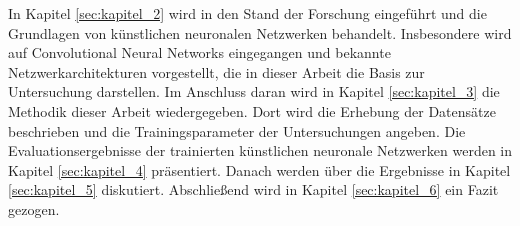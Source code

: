In Kapitel \ref{sec:kapitel_2} wird in den Stand der Forschung eingeführt und die Grundlagen von künstlichen neuronalen Netzwerken behandelt. Insbesondere wird auf Convolutional Neural Networks eingegangen und bekannte Netzwerkarchitekturen vorgestellt, die in dieser Arbeit die Basis zur Untersuchung darstellen.
Im Anschluss daran wird in Kapitel \ref{sec:kapitel_3} die Methodik dieser Arbeit wiedergegeben. Dort wird die Erhebung der Datensätze beschrieben und die Trainingsparameter der Untersuchungen angeben. 
Die Evaluationsergebnisse der trainierten künstlichen neuronale Netzwerken werden in Kapitel \ref{sec:kapitel_4} präsentiert. Danach werden über die Ergebnisse in Kapitel \ref{sec:kapitel_5} diskutiert. Abschließend wird in Kapitel \ref{sec:kapitel_6} ein Fazit gezogen. 


